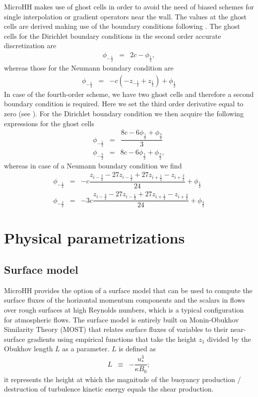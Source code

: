\documentclass[gmd]{copernicus}
\begin{document}
MicroHH makes use of ghost cells in order to avoid the need of biased schemes for single interpolation or gradient operators near the wall. The values at the ghost cells are derived making use of the boundary conditions following \citet{Morinishi1998}. The ghost cells for the Dirichlet boundary conditions in the second order accurate discretization are
\begin{eqnarray}
\phi_{-\frac{1}{2}} & = & 2 c - \phi_{\frac{1}{2}},
\end{eqnarray}
whereas those for the Neumann boundary condition are
\begin{eqnarray}
\phi_{-\frac{1}{2}} & = & -c \left( - z_{-\frac{1}{2}} + z_{\frac{1}{2}} \right) + \phi_{\frac{1}{2}}
\end{eqnarray}
In case of the fourth-order scheme, we have two ghost cells and therefore a second boundary condition is required. Here we set the third order derivative equal to zero (see \citet{Morinishi1998}). For the Dirichlet boundary condition we then acquire the following expressions for the ghost cells
\begin{eqnarray}
\phi_{-\frac{1}{2}} & = & \dfrac{8 c - 6 \phi_{\frac{1}{2}} + \phi_{\frac{3}{2}}}{3} \\
\phi_{-\frac{3}{2}} & = & 8 c - 6 \phi_{\frac{1}{2}} + \phi_{\frac{3}{2}},
\end{eqnarray}
whereas in case of a Neumann boundary condition we find
\begin{eqnarray}
\phi_{-\frac{1}{2}} & = & -c  \dfrac{z_{i-\frac{3}{2}} - 27 z_{i-\frac{1}{2}} + 27 z_{i+\frac{1}{2}} - z_{i+\frac{3}{2}}}{24} + \phi_{\frac{1}{2}} \\
\phi_{-\frac{3}{2}} & = & -3c \dfrac{z_{i-\frac{3}{2}} - 27 z_{i-\frac{1}{2}} + 27 z_{i+\frac{1}{2}} - z_{i+\frac{3}{2}}}{24} + \phi_{\frac{3}{2}}
\end{eqnarray}

\section{Physical parametrizations}\label{sec:parametrizations}

\subsection{Surface model}
MicroHH provides the option of a surface model that can be used to compute the surface fluxes of the horizontal momentum components and the scalars in flows over rough surfaces at high Reynolds numbers, which is a typical configuration for atmospheric flows. The surface model is entirely built on Monin-Obukhov Similarity Theory (MOST) that relates surface fluxes of variables to their near-surface gradients using empirical functions that take the height $z_1$ divided by the Obukhov length $L$ as a parameter. $L$ is defined as
\begin{eqnarray}
L   & \equiv & - \dfrac{u_*^3}{\kappa B_0};
\end{eqnarray}
it represents the height at which the magnitude of the buoyancy production / destruction of turbulence kinetic energy equals the shear production.
\end{document}
